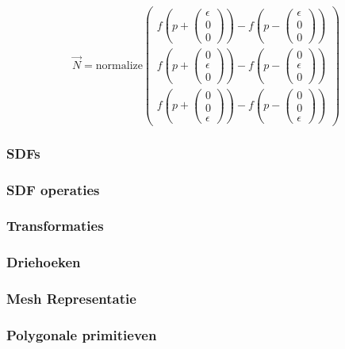 \documentclass[12pt, a4paper]{article}
\newcommand*{\ora}{\overrightarrow}
\begin{document}
\[
\ora{N}=\text{normalize}\begin{pmatrix} 
f\left(p+\begin{pmatrix} \epsilon \\ 0 \\ 0 \end{pmatrix}\right)-f\left(p-\begin{pmatrix} \epsilon \\ 0 \\ 0 \end{pmatrix}\right) \\
f\left(p+\begin{pmatrix} 0 \\ \epsilon \\ 0 \end{pmatrix}\right)-f\left(p-\begin{pmatrix} 0 \\ \epsilon \\ 0 \end{pmatrix}\right) \\
f\left(p+\begin{pmatrix} 0 \\ 0 \\ \epsilon \end{pmatrix}\right)-f\left(p-\begin{pmatrix} 0 \\ 0 \\ \epsilon \end{pmatrix}\right)
\end{pmatrix}\]

\subsubsection{SDFs}
\subsubsection{SDF operaties}
\subsubsection{Transformaties}
\subsubsection{Driehoeken}
\subsubsection{Mesh Representatie}
\subsubsection{Polygonale primitieven}
\end{document}
